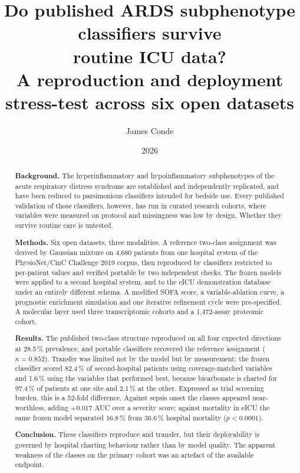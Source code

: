 \documentclass[11pt,letterpaper]{article}
\title{\bfseries Do published ARDS subphenotype classifiers survive\\
routine ICU data?\\[0.35em]
\large A reproduction and deployment stress-test across six open datasets}
\author{James Conde}
\date{2026}
\begin{document}
\maketitle

\begin{abstract}
\noindent
\textbf{Background.} The hyperinflammatory and hypoinflammatory subphenotypes of the acute
respiratory distress syndrome are established and independently replicated, and have been
reduced to parsimonious classifiers intended for bedside use. Every published validation of
those classifiers, however, has run in curated research cohorts, where variables were
measured on protocol and missingness was low by design. Whether they survive routine care
is untested.

\textbf{Methods.} Six open datasets, three modalities. A reference two-class assignment was
derived by Gaussian mixture on 4,680 patients from one hospital system of the
PhysioNet/CinC Challenge 2019 corpus, then reproduced by classifiers restricted to
per-patient values and verified portable by two independent checks. The frozen models were
applied to a second hospital system, and to the eICU demonstration database under an
entirely different schema. A modified SOFA score, a variable-ablation curve, a prognostic
enrichment simulation and one iterative refinement cycle were pre-specified. A molecular
layer used three transcriptomic cohorts and a 1,472-assay proteomic cohort.

\textbf{Results.} The published two-class structure reproduced on all four expected
directions at 28.5\,\% prevalence, and portable classifiers recovered the reference
assignment ($\kappa = 0.852$). Transfer was limited not by the model but by measurement: the
frozen classifier scored 82.4\,\% of second-hospital patients using coverage-matched
variables and 1.6\,\% using the variables that performed best, because bicarbonate is
charted for 97.4\,\% of patients at one site and 2.1\,\% at the other. Expressed as trial
screening burden, this is a 52-fold difference. Against sepsis onset the classes appeared
near-worthless, adding $+0.017$ AUC over a severity score; against mortality in eICU the
same frozen model separated 16.8\,\% from 36.6\,\% hospital mortality ($p < 0.0001$).

\textbf{Conclusion.} These classifiers reproduce and transfer, but their deployability is
governed by hospital charting behaviour rather than by model quality. The apparent weakness
of the classes on the primary cohort was an artefact of the available endpoint.
\end{abstract}
\end{document}
